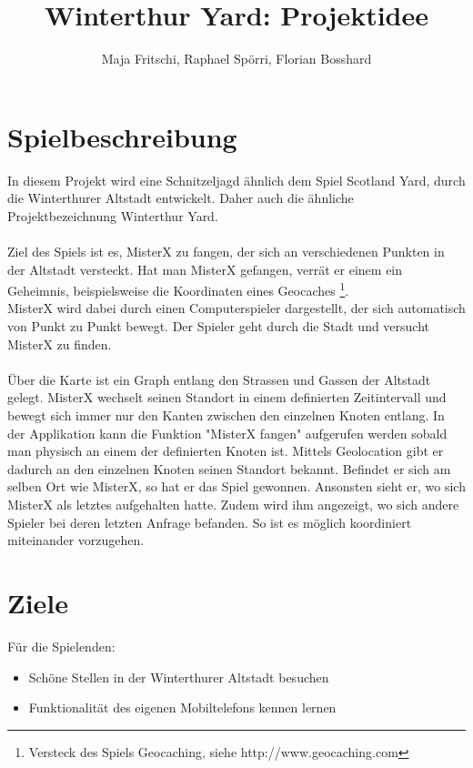 \documentclass[11pt]{article}
\title{Winterthur Yard: Projektidee}
\author{Maja Fritschi, Raphael Spörri, Florian Bosshard}
\date{}
\begin{document}
\maketitle

\tableofcontents
\newpage

\section{Spielbeschreibung}
In diesem Projekt wird eine Schnitzeljagd ähnlich dem Spiel Scotland Yard, durch die Winterthurer Altstadt entwickelt. Daher auch die ähnliche Projektbezeichnung Winterthur Yard. 
\\\\
Ziel des Spiels ist es, MisterX zu fangen, der sich an verschiedenen Punkten in der Altstadt versteckt. Hat man MisterX gefangen, verrät er einem ein Geheimnis, beispielsweise die Koordinaten eines Geocaches \footnote{Versteck des Spiels Geocaching, siehe http://www.geocaching.com}. 
\\
MisterX wird dabei durch einen Computerspieler dargestellt, der sich automatisch von Punkt zu Punkt bewegt. Der Spieler geht durch die Stadt und versucht MisterX zu finden. 
\\\\
Über die Karte ist ein Graph entlang den Strassen und Gassen der Altstadt gelegt. MisterX wechselt seinen Standort in einem definierten Zeitintervall und bewegt sich immer nur den Kanten zwischen den einzelnen Knoten entlang. In der Applikation kann die Funktion "MisterX fangen" aufgerufen werden sobald man physisch an einem der definierten Knoten ist. Mittels Geolocation gibt er dadurch an den einzelnen Knoten seinen Standort bekannt. Befindet er sich am selben Ort wie MisterX, so hat er das Spiel gewonnen. Ansonsten sieht er, wo sich MisterX als letztes aufgehalten hatte. Zudem wird ihm  angezeigt, wo sich andere Spieler bei deren letzten Anfrage befanden. So ist es möglich koordiniert miteinander vorzugehen.


\section{Ziele}
Für die Spielenden:
\begin{itemize}
\item Schöne Stellen in der Winterthurer Altstadt besuchen
\item Funktionalität des eigenen Mobiltelefons kennen lernen
\end{itemize}
\end{document}

